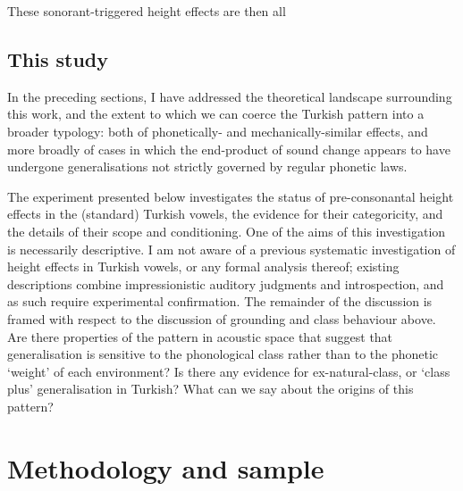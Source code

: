 These sonorant-triggered height effects are then all
%

\subsection{This study}\label{ss:trstudy}

In the preceding sections, I have addressed the theoretical landscape surrounding this work, and the extent to which we can coerce the Turkish pattern into a broader typology: both of phonetically- and mechanically-similar effects, and more broadly of cases in which the end-product of sound change appears to have undergone generalisations not strictly governed by regular phonetic laws.

The experiment presented below investigates the status of pre-consonantal height effects in the (standard) Turkish vowels, the evidence for their categoricity, and the details of their scope and conditioning. One of the aims of this investigation is necessarily descriptive. I am not aware of a previous systematic investigation of height effects in Turkish vowels, or any formal analysis thereof; existing descriptions combine impressionistic auditory judgments and introspection, and as such require experimental confirmation. The remainder of the discussion is framed with respect to the discussion of grounding and class behaviour above. Are there properties of the pattern in acoustic space that suggest that generalisation is sensitive to the phonological class rather than to the phonetic `weight' of each environment? Is there any evidence for ex-natural-class, or `class plus' generalisation in Turkish? What can we say about the origins of this pattern?

\section{Methodology and sample}\label{s:methods}

